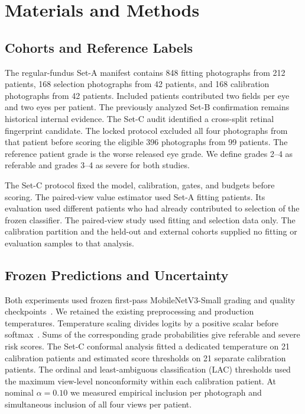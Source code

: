 \documentclass[conference]{IEEEtran}
\begin{document}
\section{Materials and Methods}

\subsection{Cohorts and Reference Labels}
The regular-fundus Set-A manifest contains 848 fitting photographs from 212
patients, 168 selection photographs from 42 patients, and 168 calibration
photographs from 42 patients. Included patients contributed two fields per eye
and two eyes per patient. The previously analyzed Set-B confirmation remains
historical internal evidence. The Set-C audit identified a cross-split retinal
fingerprint candidate. The locked protocol excluded all four photographs from
that patient before scoring the eligible 396 photographs from 99 patients.
The reference patient grade is the worse released eye grade. We define grades
2--4 as referable and grades 3--4 as severe for both studies.

The Set-C protocol fixed the model, calibration, gates, and budgets before
scoring. The paired-view value estimator used Set-A fitting patients. Its
evaluation used different patients who had already contributed to selection of
the frozen classifier. The paired-view study used fitting and selection data
only. The calibration partition and the held-out and external cohorts supplied
no fitting or evaluation samples to that analysis.

\subsection{Frozen Predictions and Uncertainty}
Both experiments used frozen first-pass MobileNetV3-Small grading and quality
checkpoints~\cite{R08}. We retained the existing preprocessing and production
temperatures. Temperature scaling divides logits by a positive scalar before
softmax~\cite{R05}. Sums of the corresponding grade probabilities give
referable and severe risk scores. The Set-C conformal analysis fitted a
dedicated temperature on 21 calibration patients and estimated score
thresholds on 21 separate calibration patients. The ordinal and
least-ambiguous classification (LAC) thresholds used the maximum view-level
nonconformity within each calibration patient. At nominal $\alpha=0.10$ we
measured empirical inclusion per photograph and simultaneous inclusion of
all four views per patient.
\end{document}
